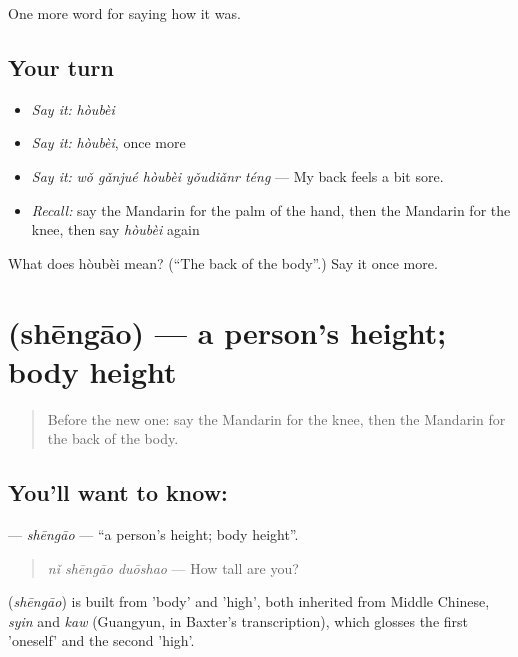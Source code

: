 \begin{grammarlens}[title={What you've built}]
One more word for saying how it was.
\end{grammarlens}

\subsection*{Your turn}
\begin{itemize}
\raggedright
  \item \emph{Say it:} \emph{hòubèi}
  \item \emph{Say it:} \emph{hòubèi}, once more
  \item \emph{Say it:} \emph{wǒ gǎnjué hòubèi yǒudiǎnr téng} — My back feels a bit sore.
  \item \emph{Recall:} say the Mandarin for the palm of the hand, then the Mandarin for the knee, then say \emph{hòubèi} again
\end{itemize}

\begin{tcolorbox}[breakable,colback=teal!4,colframe=teal!35!black,title={Before you move on}]
What does hòubèi mean? (\textquotedblleft{}The back of the body\textquotedblright{}.) Say it once more.
\end{tcolorbox}
\section[\texorpdfstring{\zh{身高} (shēngāo)}{身高 (shēngāo)}]{ (shēngāo) — a person's height; body height}

\label{lesson:ZH-C475-shengao}



\begin{quote}
Before the new one: say the Mandarin for the knee, then the Mandarin for the back of the body.
\end{quote}

\subsection*{You'll want to know: }
\textbf{} — \emph{shēngāo} — \textquotedblleft{}a person's height; body height\textquotedblright{}.

\begin{quote}
\textbf{} \emph{nǐ shēngāo duōshao} — How tall are you?
\end{quote}

\begin{cousinweb}
\textbf{} (\emph{shēngāo}) is built from  'body' and  'high', both inherited from Middle Chinese, \emph{syin} and \emph{kaw} (Guangyun, in Baxter's transcription), which glosses the first 'oneself' and the second 'high'.
\end{cousinweb}

